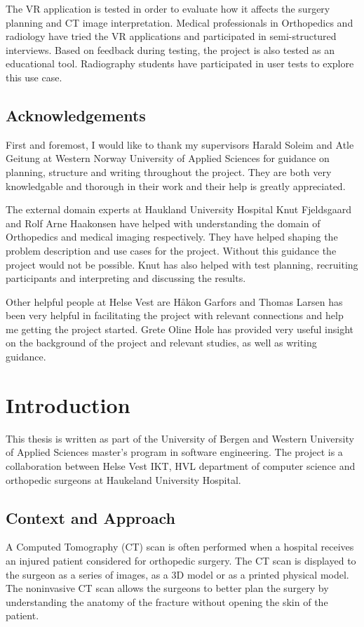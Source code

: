 \documentclass[a4paper]{report}
\begin{document}
The VR application is tested in order to evaluate how it affects the surgery planning and CT image interpretation.
Medical professionals in Orthopedics and radiology have tried the VR applications and participated in semi-structured interviews.
Based on feedback during testing, the project is also tested as an educational tool. Radiography students have participated in user tests to explore this use case.

\section*{Acknowledgements}
First and foremost, I would like to thank my supervisors Harald Soleim and Atle Geitung at Western Norway University of Applied Sciences for guidance on planning, structure and writing throughout the project. They are both very knowledgable and thorough in their work and their help is greatly appreciated.

The external domain experts at Haukland University Hospital Knut Fjeldsgaard and Rolf Arne Haakonsen have helped with understanding the domain of Orthopedics and medical imaging respectively. They have helped shaping the problem description and use cases for the project. Without this guidance the project would not be possible. Knut has also helped with test planning, recruiting participants and interpreting and discussing the results.

Other helpful people at Helse Vest are Håkon Garfors and Thomas Larsen has been very helpful in facilitating the project with relevant connections and help me getting the project started. Grete Oline Hole has provided very useful insight on the background of the project and relevant studies, as well as writing guidance.

\pagebreak
\tableofcontents
\listoffigures


\chapter{Introduction}
This thesis is written as part of the University of Bergen and Western University of Applied Sciences master's program in software engineering. The project is a collaboration between Helse Vest IKT, HVL department of computer science and orthopedic surgeons at Haukeland University Hospital.

\section{Context and Approach}
A Computed Tomography (CT) scan is often performed when a hospital receives an injured patient considered for orthopedic surgery. The CT scan is displayed to the surgeon as a series of images, as a 3D model or as a printed physical model. The noninvasive CT scan allows the surgeons to better plan the surgery by understanding the anatomy of the fracture without opening the skin of the patient.
\end{document}
